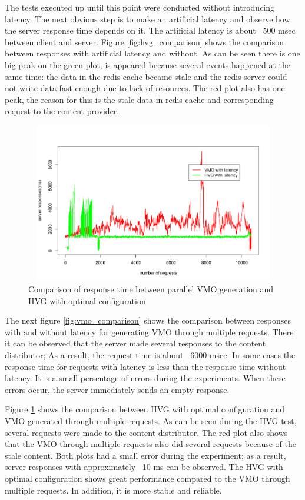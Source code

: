 The tests executed up until this point were conducted without introducing latency. The next obvious step is to make an artificial latency and observe how the server response time depends on it. The artificial latency is about ~500 msec between client and server. Figure \ref{fig:hvg_comparison} shows the comparison between responses with artificial latency and without. As can be seen there is one big peak on the green plot, is appeared because several events happened at the same time: the data in the redis cache became stale and the redis server could not write data fast enough due to lack of resources. The red plot also has one peak, the reason for this is the stale data in redis cache and corresponding request to the content provider.

\begin{figure}[h!]
    \centering
    \includegraphics[width=15cm,height=7cm,keepaspectratio]{images/hvg_vmo_latency_comparison.png}
    \caption{Comparison of response time between parallel VMO generation and HVG with optimal configuration}
    \label{fig:hvg_vmo_latency_comp}
\end{figure}


The next figure \ref{fig:vmo_comparison} shows the comparison between responses with and without latency for generating VMO through multiple requests. There it can be observed that the server made several responses to the content distributor; As a result, the request time is about ~6000 msec. In some cases the response time for requests with latency is less than the response time without latency. It is a small persentage of errors during the experiments. When these errors occur, the server immediately sends an empty response.


Figure \ref{fig:hvg_vmo_latency_comp} shows the comparison between HVG with optimal configuration and VMO generated through multiple requests. As can be seen during the HVG test, several requests were made to the content distributor. The red plot also shows that the VMO through multiple requests also did several requests because of the stale content. Both plots had a small error during the experiment; as a result, server responses with approximately ~10 ms can be observed. The HVG with optimal configuration shows great performance compared to the VMO through multiple requests. In addition, it is more stable and reliable. 




\newpage

